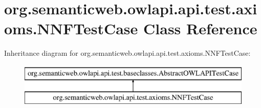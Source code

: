 \hypertarget{classorg_1_1semanticweb_1_1owlapi_1_1api_1_1test_1_1axioms_1_1_n_n_f_test_case}{\section{org.\-semanticweb.\-owlapi.\-api.\-test.\-axioms.\-N\-N\-F\-Test\-Case Class Reference}
\label{classorg_1_1semanticweb_1_1owlapi_1_1api_1_1test_1_1axioms_1_1_n_n_f_test_case}
}
Inheritance diagram for org.\-semanticweb.\-owlapi.\-api.\-test.\-axioms.\-N\-N\-F\-Test\-Case\-:\begin{figure}[H]
\begin{center}
\leavevmode
\includegraphics[height=2.000000cm]{classorg_1_1semanticweb_1_1owlapi_1_1api_1_1test_1_1axioms_1_1_n_n_f_test_case}
\end{center}
\end{figure}
